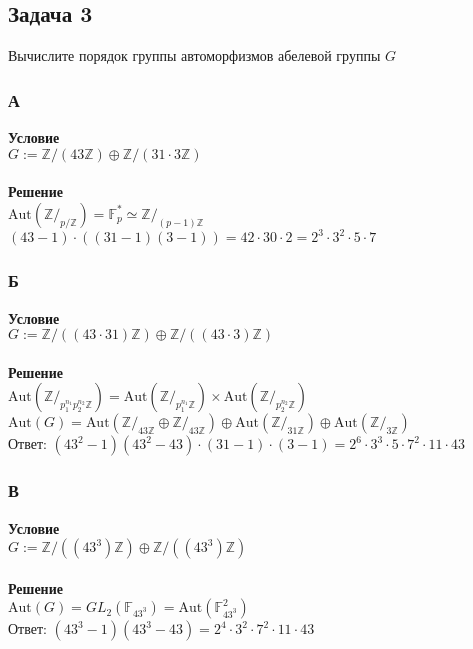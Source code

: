 		\subsection*{\textbf{Задача 3}}
		Вычислите порядок группы автоморфизмов абелевой группы $G$\\
			\subsubsection*{\textbf{А}}
			\textbf{Условие}\\
			$G:=\mathbb{Z} /(43 \mathbb{Z}) \oplus \mathbb{Z} /(31 \cdot 3 \mathbb{Z})$\\
			\\
			\textbf{Решение}\\
			$\text{Aut}(\mathbb{Z}/_{p/\mathbb{Z}}) = \mathbb{F}^{*}_{p} \simeq \mathbb{Z}/_{(p-1)\mathbb{Z}}$\\
			$(43-1) \cdot ((31-1)(3-1)) = 42 \cdot 30 \cdot 2 = 2^{3} \cdot 3^{2} \cdot 5 \cdot 7$
		
			\subsubsection*{\textbf{Б}}
			\textbf{Условие}\\
			$G:=\mathbb{Z} /((43 \cdot 31) \mathbb{Z}) \oplus \mathbb{Z} /((43 \cdot 3) \mathbb{Z})$\\
			\\
			\textbf{Решение}\\
			$\text{Aut}(\mathbb{Z}/_{p_1^{n_1} p_2^{n_2} \mathbb{Z}}) = \text{Aut}(\mathbb{Z}/_{p_1^{n_1} \mathbb{Z}}) \times \text{Aut}(\mathbb{Z}/_{p_2^{n_2} \mathbb{Z}})$\\
			$\text{Aut}(G) = \text{Aut}(\mathbb{Z}/_{43 \mathbb{Z}} \oplus \mathbb{Z}/_{43 \mathbb{Z}}) \oplus \text{Aut}(\mathbb{Z}/_{31 \mathbb{Z}}) \oplus \text{Aut}(\mathbb{Z}/_{3 \mathbb{Z}})$\\
			Ответ: $(43^{2} - 1)(43^{2} - 43) \cdot (31-1) \cdot (3-1) = 2^{6} \cdot 3^{3} \cdot 5 \cdot 7^{2} \cdot 11 \cdot 43$
		
			\subsubsection*{\textbf{В}}
			\textbf{Условие}\\
			$G:=\mathbb{Z} /\left(\left(43^{3}\right) \mathbb{Z}\right) \oplus \mathbb{Z} /\left(\left(43^{3}\right)\mathbb{Z}\right)$\\
			\\
			\textbf{Решение}\\
			$\text{Aut}(G) = GL_{2}(\mathbb{F}_{43^{3}}) = \text{Aut}(\mathbb{F}^{2}_{43^{3}})$\\
			Ответ: $(43^{3} - 1)(43^{3} - 43) = 2^{4} \cdot 3^{2} \cdot 7^{2} \cdot 11 \cdot 43$
			